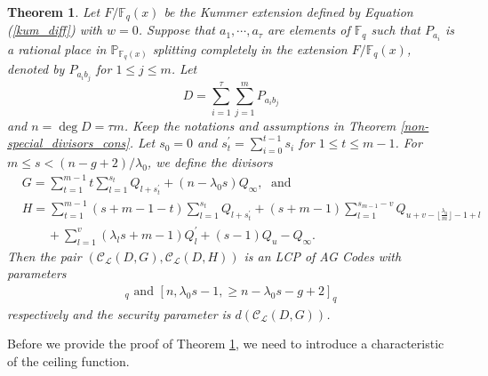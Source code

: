 \documentclass[journal,12pt,onecolumn]{IEEEtran}
\newtheorem{theorem}{Theorem}
\begin{document}
\begin{theorem}\label{con_w=0_1}
    Let $F/\mathbb{F}_q(x)$ be the Kummer extension defined by Equation (\ref{kum_diff}) with $w=0$. Suppose that $a_1,\cdots,a_\tau$ are elements of $\mathbb{F}_q$ such that $P_{a_i}$ is a rational place in $\mathbb{P}_{\mathbb{F}_q(x)}$ splitting completely in the extension $F/\mathbb{F}_q(x)$, denoted by $P_{a_ib_j}$ for $1\le j \le m$. Let
    \[
        D = \sum_{i=1}^\tau \sum_{j=1}^m P_{a_ib_j}
    \]
    and $n=\deg D=\tau m$. Keep the notations and assumptions in Theorem \ref{non-special_divisors_cons}. Let $s_0=0$ and $s_t^\prime=\sum_{i=0}^{t-1}s_i$ for $1\le t\le m-1$. For $m\le s <(n-g+2)/\lambda_0$, we define the divisors
    \begin{align*}
        & G = \sum_{t=1}^{m-1}t\sum_{l=1}^{s_t}Q_{l+s_t^\prime} + (n-\lambda_0s)Q_\infty,\;\text{ and }\\
        & H = \sum_{t=1}^{m-1}(s+m-1-t)\sum_{l=1}^{s_t}Q_{l+s_t^\prime} + (s+m-1)\sum_{l=1}^{s_{m-1}-v}Q_{u+v-\lfloor\frac{\lambda_0}{m}\rfloor-1+l}\\
        &\qquad + \sum_{l=1}^{v}(\lambda_l s+m-1)Q^\prime_l+ (s-1)Q_u - Q_\infty . 
    \end{align*}
    Then the pair $(\mathcal{C}_{\mathcal{L}}(D,G),\mathcal{C}_{\mathcal{L}}(D,H))$ is an LCP of AG Codes with parameters
    \begin{gather*}
            [n,n-\lambda_0s+1,\ge \lambda_0s-g]_q\text{ and }[n,\lambda_0s-1,\ge n-\lambda_0s-g+2]_q
    \end{gather*}
    respectively and the security parameter is $d(\mathcal{C}_{\mathcal{L}}(D,G))$. 
\end{theorem}

Before we provide the proof of Theorem \ref{con_w=0_1}, we need to introduce a characteristic of the ceiling function. 
\end{document}
